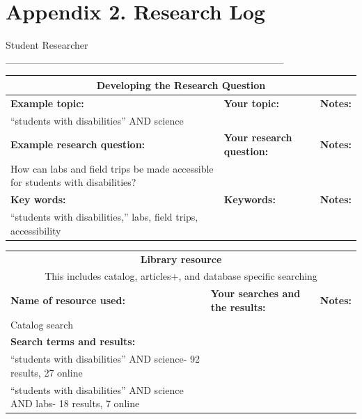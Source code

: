 \documentclass[11.5pt]{sig-alternate}
\begin{document}
\clearpage

\section*{Appendix 2. Research Log}

Student Researcher \_\_\_\_\_\_\_\_\_\_\_\_\_\_\_\_\_\_\_\_\_\_\_\_\_\_\_\_\_\_\_\_\_\_\_\_\_\_
\begin{table}[!hbp]
\begin{tabular}{|l|l|l|}
\hline
\multicolumn{3}{|c|}{\textbf{Developing the Research Question}} \\ \hline
\textbf{Example topic:} & \textbf{Your topic:} & \textbf{Notes:} \\ 
``students with disabilities'' AND science & & \\ \hline
\textbf{Example research question:} & \textbf{Your research question:} & \textbf{Notes:} \\
How can labs and field trips be made accessible for students with disabilities? & & \\ \hline
\textbf{Key words:} & \textbf{Keywords:} & \textbf{Notes:} \\ 
``students with disabilities,'' labs, field trips, accessibility & & \\ \hline
\end{tabular}
\end{table}

\begin{table}[!hbp]
\begin{tabular}{|p{2.5in}|p{2.5in}|p{1.5in}|}
\hline
\multicolumn{3}{|c|}{\textbf{Library resource}} \\
\multicolumn{3}{|c|}{This includes catalog, articles+, and database specific searching} \\ \hline
\textbf{Name of resource used:} & \textbf{Your searches and the results:} & \textbf{Notes:} \\ 
Catalog search & & \\
\textbf{Search terms and results:} & & \\
``students with disabilities'' AND science- 92 results, 27 online & & \\
``students with disabilities'' AND science AND labs- 18 results, 7 online & & \\ \hline
\end{tabular}
\end{table}
\end{document}
